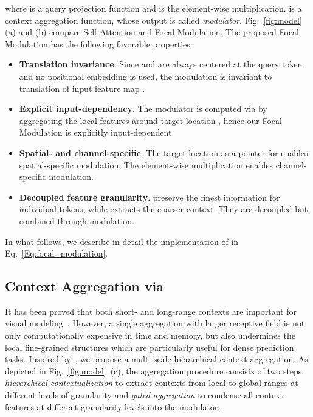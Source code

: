 \documentclass{article}
\begin{document}
where  is a query projection function and  is the element-wise multiplication.  is a context aggregation function, whose output is called \emph{modulator}. Fig.~\ref{fig:model}(a) and (b) compare Self-Attention and Focal Modulation. 
The proposed Focal Modulation has the following favorable properties:
\begin{itemize}[leftmargin=*]
  \setlength\itemsep{0em}
    \item \textbf{Translation invariance}. Since  and  are always centered at the query token  and no positional embedding is used, the modulation is invariant to translation of input feature map .
    \item \textbf{Explicit input-dependency}. The modulator is computed via  by aggregating the local features around target location , hence our Focal Modulation is explicitly input-dependent.
    \item \textbf{Spatial- and channel-specific}. The target location  as a pointer for   enables spatial-specific modulation. The element-wise multiplication enables channel-specific modulation. \item \textbf{Decoupled feature granularity}.  preserve the finest information for individual tokens, while  extracts the coarser context. They are decoupled but combined through modulation. 
\end{itemize}



In what follows, we describe in detail the implementation of  in Eq.~\eqref{Eq:focal_modulation}.

\subsection{Context Aggregation via }
\label{sec:focal_conv}
It has been proved that both short- and long-range contexts are important for visual modeling~\cite{yang2021focal,dong2021cswin,liu2022convnet}. However, a single aggregation with larger receptive field is not only computationally expensive in time and memory, 
but also undermines the local fine-grained structures which are particularly useful for dense prediction tasks. 
Inspired by~\cite{yang2021focal}, we propose a multi-scale hierarchical context aggregation. As depicted in Fig.~\ref{fig:model}~(c), the aggregation procedure consists of two steps: {\it hierarchical contextualization} to extract contexts from local to global ranges at different levels of granularity and {\it gated aggregation} to condense all context features at different granularity levels into the modulator.
\end{document}
